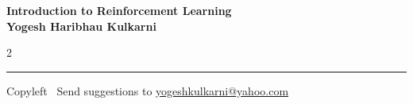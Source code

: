 \documentclass[8pt,landscape]{article}
\begin{document}
\footnotesize


\begin{center}
\Large{\textbf{Introduction to Reinforcement Learning\\ Yogesh Haribhau Kulkarni}}  
\end{center}

\begin{multicols}{2}

\end{multicols}

\rule{\linewidth}{0.25pt}
\scriptsize
Copyleft \textcopyleft\  Send suggestions to 
\href{http://www.yogeshkulkarni.com}{yogeshkulkarni@yahoo.com}
\end{document}
